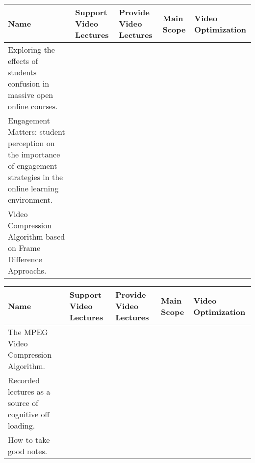 \begin{sideways}
\centering
\begin{tabularx}{1.5\textwidth} { 
  | >{\raggedright\arraybackslash}X 
  | >{\centering\arraybackslash}X | >{\centering\arraybackslash}X | >{\centering\arraybackslash}X | >{\raggedleft\arraybackslash}X | }
 \hline
\bfseries{Name} & \bfseries{Support Video Lectures} &\bfseries{Provide Video Lectures} &\bfseries{Main Scope} & \bfseries{Video Optimization}  \\
\hline
Exploring the effects of students confusion in massive open online courses.\cite{Yang2016}
&
&
&
&
\\
\hline
Engagement Matters: student perception on the importance of engagement strategies in the online learning environment.\cite{Martin2018(2)}
&
&
&
&
\\

\hline
Video Compression Algorithm based on Frame Difference Approachs.\cite{AlAni2011}
&
&
&
&
\\
\hline

\end{tabularx}
\end{sideways}


\begin{sideways}
\centering
\begin{tabularx}{1.5\textwidth} { 
  | >{\raggedright\arraybackslash}X 
  | >{\centering\arraybackslash}X | >{\centering\arraybackslash}X | >{\centering\arraybackslash}X | >{\raggedleft\arraybackslash}X | }
 \hline
\bfseries{Name} & \bfseries{Support Video Lectures} &\bfseries{Provide Video Lectures} &\bfseries{Main Scope} & \bfseries{Video Optimization}  \\
\hline
The MPEG Video Compression Algorithm.\cite{LeGall1992}
&
&
&
&
\\
\hline

Recorded lectures as a source of cognitive off loading.\cite{Patel2019}
&
&
&
&
\\

\hline
How to take good notes.\cite{Kiewra2018}
&
&
&
&
\\
\hline


\end{tabularx}
\end{sideways}


